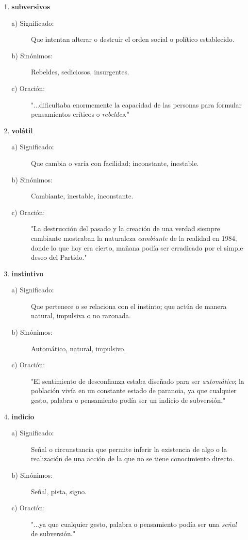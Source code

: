 \documentclass[11pt, a4paper]{article}
\begin{document}
\begin{enumerate}
    \item \textbf{subversivos} %
    \begin{description}
        \item[a) Significado:] Que intentan alterar o destruir el orden social o político establecido.
        \item[b) Sinónimos:] Rebeldes, sediciosos, insurgentes.
        \item[c) Oración:] "...dificultaba enormemente la capacidad de las personas para formular pensamientos críticos o \textit{rebeldes}."
    \end{description}

    \item \textbf{volátil}
    \begin{description}
        \item[a) Significado:] Que cambia o varía con facilidad; inconstante, inestable.
        \item[b) Sinónimos:] Cambiante, inestable, inconstante.
        \item[c) Oración:] "La destrucción del pasado y la creación de una verdad siempre cambiante mostraban la naturaleza \textit{cambiante} de la realidad en 1984, donde lo que hoy era cierto, mañana podía ser erradicado por el simple deseo del Partido."
    \end{description}

    \item \textbf{instintivo}
    \begin{description}
        \item[a) Significado:] Que pertenece o se relaciona con el instinto; que actúa de manera natural, impulsiva o no razonada.
        \item[b) Sinónimos:] Automático, natural, impulsivo.
        \item[c) Oración:] "El sentimiento de desconfianza estaba diseñado para ser \textit{automático}; la población vivía en un constante estado de paranoia, ya que cualquier gesto, palabra o pensamiento podía ser un indicio de subversión."
    \end{description}
    
    \item \textbf{indicio}
    \begin{description}
        \item[a) Significado:] Señal o circunstancia que permite inferir la existencia de algo o la realización de una acción de la que no se tiene conocimiento directo.
        \item[b) Sinónimos:] Señal, pista, signo.
        \item[c) Oración:] "...ya que cualquier gesto, palabra o pensamiento podía ser una \textit{señal} de subversión."
    \end{description}


\end{enumerate}
\end{document}
